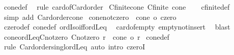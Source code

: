 \begin{isabellebody}
%
\isadelimproof
%
\endisadelimproof
%
\isatagproof
{}\isamarkupfalse%
\ cone{\isacharunderscore}{\kern0pt}def\ \isamarkupfalse%
\ {\isacharparenleft}{\kern0pt}rule\ card{\isacharunderscore}{\kern0pt}of{\isacharunderscore}{\kern0pt}Card{\isacharunderscore}{\kern0pt}order{\isacharparenright}{\kern0pt}%
\endisatagproof
{\isafoldproof}%
%
\isadelimproof
\isanewline
%
\endisadelimproof
\isanewline
{}\isamarkupfalse%
\ Cfinite{\isacharunderscore}{\kern0pt}cone{\isacharcolon}{\kern0pt}\ {\isachardoublequoteopen}Cfinite\ cone{\isachardoublequoteclose}\isanewline
%
\isadelimproof
\ \ %
\endisadelimproof
%
\isatagproof
{}\isamarkupfalse%
\ cfinite{\isacharunderscore}{\kern0pt}def\ \isamarkupfalse%
\ {\isacharparenleft}{\kern0pt}simp\ add{\isacharcolon}{\kern0pt}\ Card{\isacharunderscore}{\kern0pt}order{\isacharunderscore}{\kern0pt}cone{\isacharparenright}{\kern0pt}%
\endisatagproof
{\isafoldproof}%
%
\isadelimproof
\isanewline
%
\endisadelimproof
\isanewline
{}\isamarkupfalse%
\ cone{\isacharunderscore}{\kern0pt}not{\isacharunderscore}{\kern0pt}czero{\isacharcolon}{\kern0pt}\ {\isachardoublequoteopen}{\isasymnot}\ {\isacharparenleft}{\kern0pt}cone\ {\isacharequal}{\kern0pt}o\ czero{\isacharparenright}{\kern0pt}{\isachardoublequoteclose}\isanewline
%
\isadelimproof
%
\endisadelimproof
%
\isatagproof
{}\isamarkupfalse%
\ czero{\isacharunderscore}{\kern0pt}def\ cone{\isacharunderscore}{\kern0pt}def\ ordIso{\isacharunderscore}{\kern0pt}iff{\isacharunderscore}{\kern0pt}ordLeq\ \isamarkupfalse%
\ card{\isacharunderscore}{\kern0pt}of{\isacharunderscore}{\kern0pt}empty{}\ empty{\isacharunderscore}{\kern0pt}not{\isacharunderscore}{\kern0pt}insert\ \isamarkupfalse%
\ blast%
\endisatagproof
{\isafoldproof}%
%
\isadelimproof
\isanewline
%
\endisadelimproof
\isanewline
{}\isamarkupfalse%
\ cone{\isacharunderscore}{\kern0pt}ordLeq{\isacharunderscore}{\kern0pt}Cnotzero{\isacharcolon}{\kern0pt}\ {\isachardoublequoteopen}Cnotzero\ r\ {\isasymLongrightarrow}\ cone\ {\isasymle}o\ r{\isachardoublequoteclose}\isanewline
%
\isadelimproof
%
\endisadelimproof
%
\isatagproof
{}\isamarkupfalse%
\ cone{\isacharunderscore}{\kern0pt}def\ \isamarkupfalse%
\ {\isacharparenleft}{\kern0pt}rule\ Card{\isacharunderscore}{\kern0pt}order{\isacharunderscore}{\kern0pt}singl{\isacharunderscore}{\kern0pt}ordLeq{\isacharparenright}{\kern0pt}\ {\isacharparenleft}{\kern0pt}auto\ intro{\isacharcolon}{\kern0pt}\ czeroI{\isacharparenright}{\kern0pt}%

\end{isabellebody}
